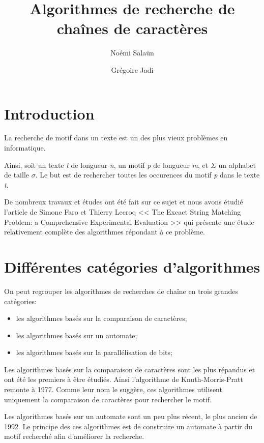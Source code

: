 \documentclass[a4paper,11pt]{article}
\begin{document}
\title{Algorithmes de recherche de chaînes de caractères}
\author{Noémi Salaün \and{} Grégoire Jadi}

\maketitle

\section{Introduction}

La recherche de motif dans un texte est un des plus vieux problèmes en informatique.

Ainsi, soit un texte \emph{t} de longueur \emph{n}, un motif \emph{p} de longueur \emph{m}, et $ \Sigma $ un alphabet de taille $ \sigma $. Le but est de rechercher toutes les occurences du motif \emph{p} dans le texte \emph{t}.

De nombreux travaux et études ont été fait sur ce sujet et nous avons étudié l'article de Simone Faro et Thierry Lecroq << The Excact String Matching Problem: a Comprehensive Experimental Evaluation >>\cite{exact_string_matching_problem} qui présente une étude relativement complète des algorithmes répondant à ce problème.

\section{Différentes catégories d'algorithmes}

On peut regrouper les algorithmes de recherches de chaîne en trois grandes catégories:

\begin{itemize}
\item les algorithmes basés sur la comparaison de caractères;
\item les algorithmes basés sur un automate;
\item les algorithmes basés sur la parallélisation de bits;
\end{itemize}

Les algorithmes basés sur la comparaison de caractères sont les plus répandus et ont été les premiers à être étudiés. Ainsi l'algorithme de Knuth-Morris-Pratt remonte à 1977. Comme leur nom le suggère, ces algorithmes utilisent uniquement la comparaison de caractères pour rechercher le motif.

Les algorithmes basés sur un automate sont un peu plus récent, le plus ancien de 1992. Le principe des ces algorithmes est de construire un automate à partir du motif recherché afin d'améliorer la recherche.
\end{document}
